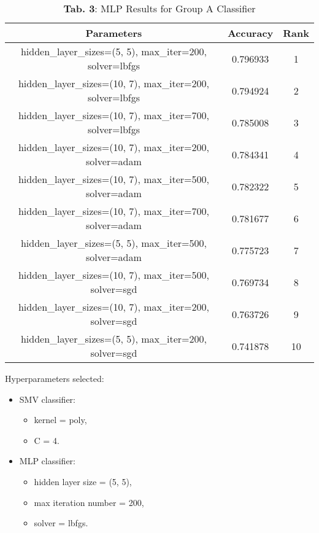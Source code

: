 \documentclass{article}
\begin{document}
\vspace{1cm}


\begin{table}[h!]
\centering
\begin{tabular}{|c|c|c|}
\hline
\textbf{Parameters}                                & \textbf{Accuracy} & \textbf{Rank} \\ \hline
hidden\_layer\_sizes=(5, 5), max\_iter=200, solver=lbfgs  & 0.796933          & 1             \\ \hline
hidden\_layer\_sizes=(10, 7), max\_iter=200, solver=lbfgs & 0.794924          & 2             \\ \hline
hidden\_layer\_sizes=(10, 7), max\_iter=700, solver=lbfgs & 0.785008          & 3             \\ \hline
hidden\_layer\_sizes=(10, 7), max\_iter=200, solver=adam  & 0.784341          & 4             \\ \hline
hidden\_layer\_sizes=(10, 7), max\_iter=500, solver=adam  & 0.782322          & 5             \\ \hline
hidden\_layer\_sizes=(10, 7), max\_iter=700, solver=adam  & 0.781677          & 6             \\ \hline
hidden\_layer\_sizes=(5, 5), max\_iter=500, solver=adam   & 0.775723          & 7             \\ \hline
hidden\_layer\_sizes=(10, 7), max\_iter=500, solver=sgd   & 0.769734          & 8             \\ \hline
hidden\_layer\_sizes=(10, 7), max\_iter=200, solver=sgd   & 0.763726          & 9             \\ \hline
hidden\_layer\_sizes=(5, 5), max\_iter=200, solver=sgd    & 0.741878          & 10            \\ \hline
\end{tabular}
\caption{\textbf{Tab. 3}: MLP Results for Group A Classifier}
\label{tab:mlp_hard_drugs}
\end{table}

\vspace{1cm}

Hyperparameters selected:

\begin{itemize}
    \item SMV classifier:
    \begin{itemize}
        \item kernel = poly,
        \item C = 4.
    \end{itemize}
    \item MLP classifier:
    \begin{itemize}
        \item hidden layer size = (5, 5),
        \item max iteration number = 200,
        \item solver = lbfgs.
    \end{itemize}
\end{itemize}
\end{document}

